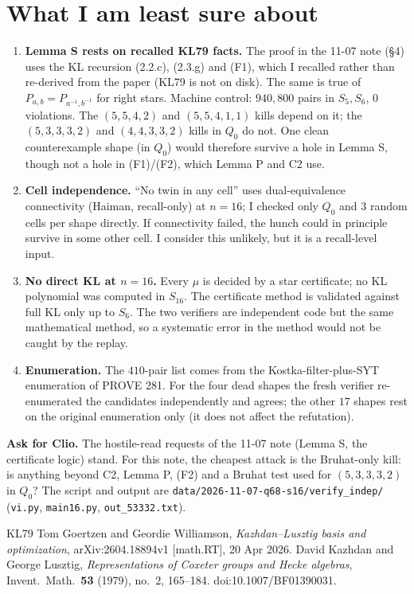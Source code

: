 \documentclass[11pt]{amsart}
\theoremstyle{definition}
\theoremstyle{remark}
\begin{document}
\section{What I am least sure about}

\begin{enumerate}[leftmargin=*,itemsep=2pt]
\item \textbf{Lemma S rests on recalled KL79 facts.} The proof in the 11-07 note (\S4) uses the KL recursion (2.2.c), (2.3.g) and (F1), which I recalled rather than re-derived from the paper (KL79 is not on disk). The same is true of $P_{a,b}=P_{a^{-1},b^{-1}}$ for right stars. Machine control: $940{,}800$ pairs in $S_5,S_6$, $0$ violations. The $(5,5,4,2)$ and $(5,5,4,1,1)$ kills depend on it; the $(5,3,3,3,2)$ and $(4,4,3,3,2)$ kills in $Q_0$ do not. One clean counterexample shape (in $Q_0$) would therefore survive a hole in Lemma S, though not a hole in (F1)/(F2), which Lemma P and C2 use.
\item \textbf{Cell independence.} ``No twin in any cell'' uses dual-equivalence connectivity (Haiman, recall-only) at $n=16$; I checked only $Q_0$ and $3$ random cells per shape directly. If connectivity failed, the hunch could in principle survive in some other cell. I consider this unlikely, but it is a recall-level input.
\item \textbf{No direct KL at $n=16$.} Every $\mu$ is decided by a star certificate; no KL polynomial was computed in $S_{16}$. The certificate method is validated against full KL only up to $S_6$. The two verifiers are independent code but the same mathematical method, so a systematic error in the method would not be caught by the replay.
\item \textbf{Enumeration.} The $410$-pair list comes from the Kostka-filter-plus-SYT enumeration of PROVE 281. For the four dead shapes the fresh verifier re-enumerated the candidates independently and agrees; the other $17$ shapes rest on the original enumeration only (it does not affect the refutation).
\end{enumerate}

\textbf{Ask for Clio.} The hostile-read requests of the 11-07 note (Lemma S, the certificate logic) stand. For this note, the cheapest attack is the Bruhat-only kill: is anything beyond C2, Lemma P, (F2) and a Bruhat test used for $(5,3,3,3,2)$ in $Q_0$? The script and output are \texttt{data/2026-11-07-q68-s16/verify\_indep/} (\texttt{vi.py}, \texttt{main16.py}, \texttt{out\_53332.txt}).

\begin{thebibliography}{KL79}
 Tom Goertzen and Geordie Williamson, \emph{Kazhdan--Lusztig basis and optimization}, arXiv:2604.18894v1 [math.RT], 20 Apr 2026.
 David Kazhdan and George Lusztig, \emph{Representations of Coxeter groups and Hecke algebras}, Invent.\ Math.\ \textbf{53} (1979), no.~2, 165--184. doi:10.1007/BF01390031.
\end{thebibliography}
\end{document}
